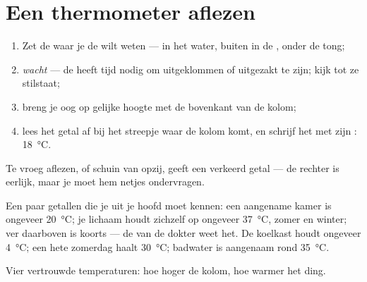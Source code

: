 \section{Een thermometer aflezen}

\begin{method}\label{met:g3:temperature-thermometers:read}
\begin{enumerate}
  \item Zet de  waar je de  wilt weten --- in het
        water, buiten in de , onder de tong;
  \item \emph{wacht} --- de  heeft tijd nodig om uitgeklommen
        of uitgezakt te zijn; kijk tot ze stilstaat;
  \item breng je oog op gelijke hoogte met de bovenkant van de kolom;
  \item lees het getal af bij het streepje waar de kolom komt, en
        schrijf het met zijn : \qty{18}{\celsius}.
\end{enumerate}
Te vroeg aflezen, of schuin van opzij, geeft een verkeerd getal --- de
rechter is eerlijk, maar je moet hem netjes ondervragen.
\end{method}

\begin{example}\label{ex:g3:temperature-thermometers:livedby}
Een paar getallen die je uit je hoofd moet kennen: een aangename kamer
is ongeveer \qty{20}{\celsius}; je lichaam houdt zichzelf op ongeveer
\qty{37}{\celsius}, zomer en winter; ver daarboven is koorts --- de
 van de dokter weet het. De koelkast houdt ongeveer
\qty{4}{\celsius}; een hete zomerdag haalt \qty{30}{\celsius};
badwater is aangenaam rond \qty{35}{\celsius}.
\end{example}

\begin{omfigure}

{\small Vier vertrouwde temperaturen: hoe hoger de kolom, hoe warmer
het ding.}
\end{omfigure}

